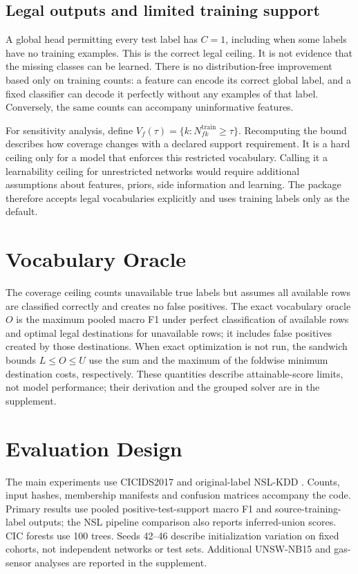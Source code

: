\documentclass[namedate,webpdf,contemporary,large]{TBench-template}
\begin{document}
\subsection{Legal outputs and limited training support}
A global head permitting every test label has \(C=1\), including when some labels have no training examples. This is the correct legal ceiling. It is not evidence that the missing classes can be learned. There is no distribution-free improvement based only on training counts: a feature can encode its correct global label, and a fixed classifier can decode it perfectly without any examples of that label. Conversely, the same counts can accompany uninformative features.

For sensitivity analysis, define \(V_f(\tau)=\{k:N^{\mathrm{train}}_{fk}\ge\tau\}\). Recomputing the bound describes how coverage changes with a declared support requirement. It is a hard ceiling only for a model that enforces this restricted vocabulary. Calling it a learnability ceiling for unrestricted networks would require additional assumptions about features, priors, side information and learning. The package therefore accepts legal vocabularies explicitly and uses training labels only as the default.

\section{Vocabulary Oracle}
The coverage ceiling counts unavailable true labels but assumes all available rows are classified correctly and creates no false positives. The exact vocabulary oracle \(O\) is the maximum pooled macro F1 under perfect classification of available rows and optimal legal destinations for unavailable rows; it includes false positives created by those destinations. When exact optimization is not run, the sandwich bounds \(L\le O\le U\) use the sum and the maximum of the foldwise minimum destination costs, respectively. These quantities describe attainable-score limits, not model performance; their derivation and the grouped solver are in the supplement.

\section{Evaluation Design}
The main experiments use CICIDS2017 \cite{sharafaldin2018} and original-label NSL-KDD \cite{tavallaee2009}. Counts, input hashes, membership manifests and confusion matrices accompany the code. Primary results use pooled positive-test-support macro F1 and source-training-label outputs; the NSL pipeline comparison also reports inferred-union scores. CIC forests use 100 trees. Seeds 42--46 describe initialization variation on fixed cohorts, not independent networks or test sets. Additional UNSW-NB15 and gas-sensor analyses are reported in the supplement.
\end{document}
